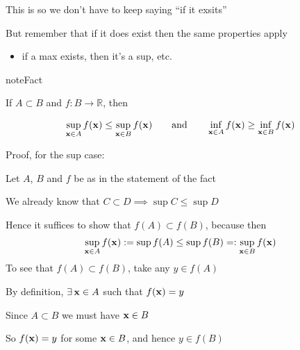 \documentclass[letterpaper,10pt,english]{jupyterBook}
\begin{document}
\sphinxAtStartPar
This is so we don’t have to keep saying “if it exsits”

\sphinxAtStartPar
But remember that if it does exist then the same properties apply
\begin{itemize}
\item {} 
\sphinxAtStartPar
if a max exists, then it’s a sup, etc.

\end{itemize}

\begin{sphinxadmonition}{note}{Fact}

\sphinxAtStartPar
If \(A \subset B\) and \(f \colon B \to \mathbb{R}\), then
\end{sphinxadmonition}
\begin{equation*}
\begin{split}
%
\sup_{{\bf x} \in A} f({\bf x}) \leq \sup_{{\bf x} \in B} f({\bf x})
\qquad \text{and} \qquad
\inf_{{\bf x} \in A} f({\bf x}) \geq \inf_{{\bf x} \in B} f({\bf x})
%
\end{split}
\end{equation*}
\begin{figure}[htbp]
\centering

\noindent{}
\end{figure}

\sphinxAtStartPar
Proof, for the sup case:

\sphinxAtStartPar
Let \(A\), \(B\) and \(f\) be as in the statement of the fact

\sphinxAtStartPar
We already know that \(C \subset D \implies \sup C \leq \sup D\)

\sphinxAtStartPar
Hence it suffices to show that \(f(A) \subset f(B)\), because then
\begin{equation*}
\begin{split}
%
\sup_{{\bf x} \in A} f({\bf x}) 
:= \sup f(A)
\leq \sup f(B) 
=: \sup_{{\bf x} \in B} f({\bf x})
%
\end{split}
\end{equation*}
\sphinxAtStartPar
To see that \(f(A) \subset f(B)\), take any \(y \in f(A)\)

\sphinxAtStartPar
By definition, \(\exists \, {\bf x} \in A\) such that \(f({\bf x}) = y\)

\sphinxAtStartPar
Since \(A \subset B\) we must have \({\bf x} \in B\)

\sphinxAtStartPar
So \(f({\bf x}) = y\) for some \({\bf x} \in B\), and hence \(y \in f(B)\)
\end{document}
